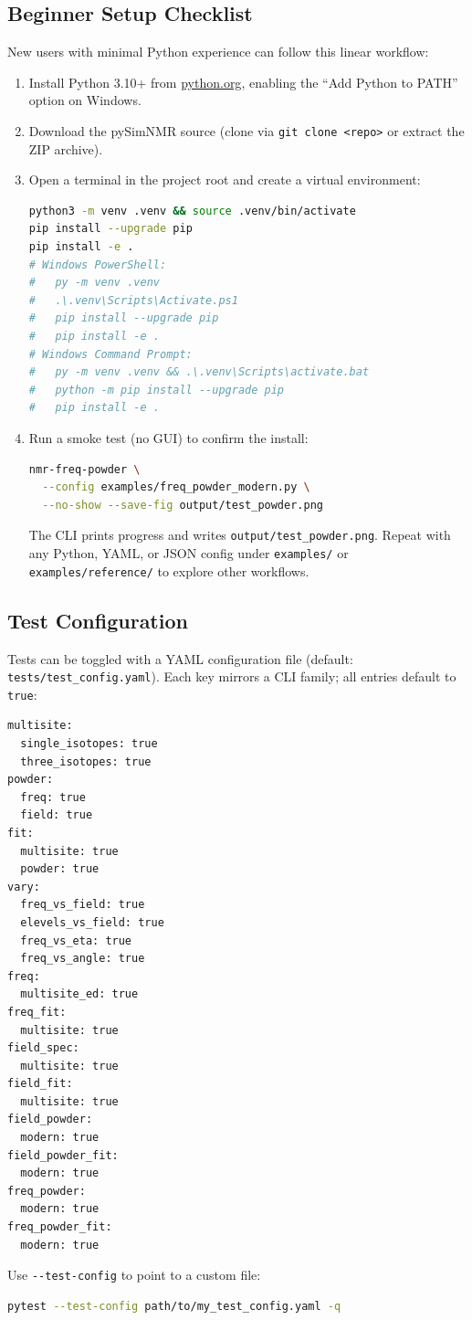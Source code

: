 \documentclass[12pt]{article}
\begin{document}
\subsection{Beginner Setup Checklist}
New users with minimal Python experience can follow this linear workflow:
\begin{enumerate}
  \item Install Python 3.10+ from \href{https://www.python.org/downloads/}{python.org}, enabling the ``Add Python to PATH'' option on Windows.
  \item Download the pySimNMR source (clone via \texttt{git clone <repo>} or extract the ZIP archive).
  \item Open a terminal in the project root and create a virtual environment:
\begin{lstlisting}[language=bash]
python3 -m venv .venv && source .venv/bin/activate
pip install --upgrade pip
pip install -e .
# Windows PowerShell:
#   py -m venv .venv
#   .\.venv\Scripts\Activate.ps1
#   pip install --upgrade pip
#   pip install -e .
# Windows Command Prompt:
#   py -m venv .venv && .\.venv\Scripts\activate.bat
#   python -m pip install --upgrade pip
#   pip install -e .
\end{lstlisting}
  \item Run a smoke test (no GUI) to confirm the install:
\begin{lstlisting}[language=bash]
nmr-freq-powder \
  --config examples/freq_powder_modern.py \
  --no-show --save-fig output/test_powder.png
\end{lstlisting}
The CLI prints progress and writes \texttt{output/test\_powder.png}. Repeat with any Python, YAML, or JSON config under \texttt{examples/} or \texttt{examples/reference/} to explore other workflows.
\end{enumerate}

\subsection{Test Configuration}
Tests can be toggled with a YAML configuration file (default: \verb|tests/test_config.yaml|). Each key mirrors a CLI family; all entries default to \verb|true|:
\begin{lstlisting}
multisite:
  single_isotopes: true
  three_isotopes: true
powder:
  freq: true
  field: true
fit:
  multisite: true
  powder: true
vary:
  freq_vs_field: true
  elevels_vs_field: true
  freq_vs_eta: true
  freq_vs_angle: true
freq:
  multisite_ed: true
freq_fit:
  multisite: true
field_spec:
  multisite: true
field_fit:
  multisite: true
field_powder:
  modern: true
field_powder_fit:
  modern: true
freq_powder:
  modern: true
freq_powder_fit:
  modern: true
\end{lstlisting}
Use \verb|--test-config| to point to a custom file:
\begin{lstlisting}[language=bash]
pytest --test-config path/to/my_test_config.yaml -q
\end{lstlisting}
\end{document}

